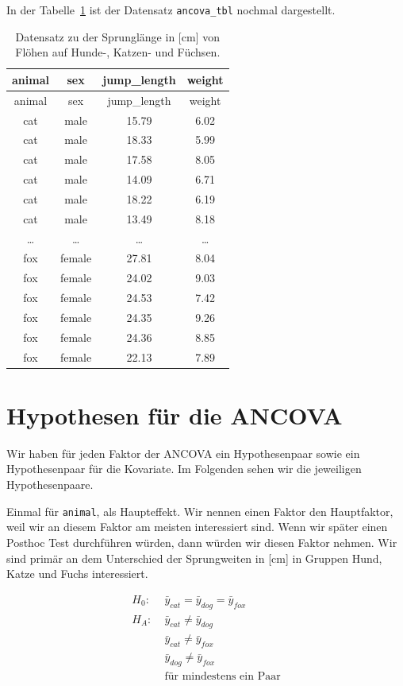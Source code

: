 \documentclass[
  letterpaper,
]{scrbook}
\begin{document}
In der Tabelle~\ref{tbl-model-1} ist der Datensatz \texttt{ancova\_tbl}
nochmal dargestellt.

\hypertarget{tbl-model-1}{}
\begin{longtable}[]{@{}cccc@{}}
\caption{\label{tbl-model-1}Datensatz zu der Sprunglänge in {[}cm{]} von
Flöhen auf Hunde-, Katzen- und Füchsen.}\tabularnewline
\toprule()
animal & sex & jump\_length & weight \\
\midrule()
\endfirsthead
\toprule()
animal & sex & jump\_length & weight \\
\midrule()
\endhead
cat & male & 15.79 & 6.02 \\
cat & male & 18.33 & 5.99 \\
cat & male & 17.58 & 8.05 \\
cat & male & 14.09 & 6.71 \\
cat & male & 18.22 & 6.19 \\
cat & male & 13.49 & 8.18 \\
\ldots{} & \ldots{} & \ldots{} & \ldots{} \\
fox & female & 27.81 & 8.04 \\
fox & female & 24.02 & 9.03 \\
fox & female & 24.53 & 7.42 \\
fox & female & 24.35 & 9.26 \\
fox & female & 24.36 & 8.85 \\
fox & female & 22.13 & 7.89 \\
\bottomrule()
\end{longtable}

\hypertarget{hypothesen-fuxfcr-die-ancova}{%
\section{Hypothesen für die ANCOVA}\label{hypothesen-fuxfcr-die-ancova}}

Wir haben für jeden Faktor der ANCOVA ein Hypothesenpaar sowie ein
Hypothesenpaar für die Kovariate. Im Folgenden sehen wir die jeweiligen
Hypothesenpaare.

Einmal für \texttt{animal}, als Haupteffekt. Wir nennen einen Faktor den
Hauptfaktor, weil wir an diesem Faktor am meisten interessiert sind.
Wenn wir später einen Posthoc Test durchführen würden, dann würden wir
diesen Faktor nehmen. Wir sind primär an dem Unterschied der
Sprungweiten in {[}cm{]} in Gruppen Hund, Katze und Fuchs interessiert.

\[
\begin{align*}
H_0: &\; \bar{y}_{cat} = \bar{y}_{dog} = \bar{y}_{fox}\\
H_A: &\; \bar{y}_{cat} \ne \bar{y}_{dog}\\
\phantom{H_A:} &\; \bar{y}_{cat} \ne \bar{y}_{fox}\\
\phantom{H_A:} &\; \bar{y}_{dog} \ne \bar{y}_{fox}\\
\phantom{H_A:} &\; \mbox{für mindestens ein Paar}
\end{align*}
\]
\end{document}
